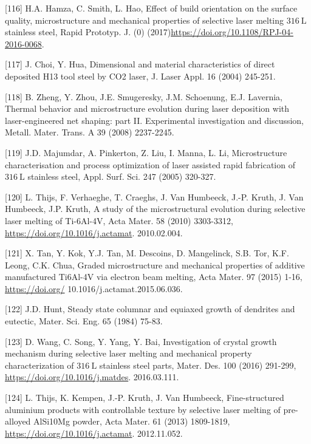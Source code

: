 \documentclass[10pt]{article}
\begin{document}
[116] H.A. Hamza, C. Smith, L. Hao, Effect of build orientation on the surface quality, microstructure and mechanical properties of selective laser melting $316 \mathrm{~L}$ stainless steel, Rapid Prototyp. J. (0) (2017)\href{https://doi.org/10.1108/RPJ-04-2016-0068}{https://doi.org/10.1108/RPJ-04-2016-0068}.

[117] J. Choi, Y. Hua, Dimensional and material characteristics of direct deposited H13 tool steel by CO2 laser, J. Laser Appl. 16 (2004) 245-251.

[118] B. Zheng, Y. Zhou, J.E. Smugeresky, J.M. Schoenung, E.J. Lavernia, Thermal behavior and microstructure evolution during laser deposition with laser-engineered net shaping: part II. Experimental investigation and discussion, Metall. Mater. Trans. A 39 (2008) 2237-2245.

[119] J.D. Majumdar, A. Pinkerton, Z. Liu, I. Manna, L. Li, Microstructure characterisation and process optimization of laser assisted rapid fabrication of $316 \mathrm{~L}$ stainless steel, Appl. Surf. Sci. 247 (2005) 320-327.

[120] L. Thijs, F. Verhaeghe, T. Craeghs, J. Van Humbeeck, J.-P. Kruth, J. Van Humbeeck, J.P. Kruth, A study of the microstructural evolution during selective laser melting of Ti-6Al-4V, Acta Mater. 58 (2010) 3303-3312, \href{https://doi.org/10.1016/j.actamat}{https://doi.org/10.1016/j.actamat}. 2010.02.004.

[121] X. Tan, Y. Kok, Y.J. Tan, M. Descoins, D. Mangelinck, S.B. Tor, K.F. Leong, C.K. Chua, Graded microstructure and mechanical properties of additive manufactured Ti6Al-4V via electron beam melting, Acta Mater. 97 (2015) 1-16, \href{https://doi.org/}{https://doi.org/} 10.1016/j.actamat.2015.06.036.

[122] J.D. Hunt, Steady state columnar and equiaxed growth of dendrites and eutectic, Mater. Sci. Eng. 65 (1984) 75-83.

[123] D. Wang, C. Song, Y. Yang, Y. Bai, Investigation of crystal growth mechanism during selective laser melting and mechanical property characterization of $316 \mathrm{~L}$ stainless steel parts, Mater. Des. 100 (2016) 291-299, \href{https://doi.org/10.1016/j.matdes}{https://doi.org/10.1016/j.matdes}. 2016.03.111.

[124] L. Thijs, K. Kempen, J.-P. Kruth, J. Van Humbeeck, Fine-structured aluminium products with controllable texture by selective laser melting of pre-alloyed AlSi10Mg powder, Acta Mater. 61 (2013) 1809-1819, \href{https://doi.org/10.1016/j.actamat}{https://doi.org/10.1016/j.actamat}. 2012.11.052.
\end{document}

